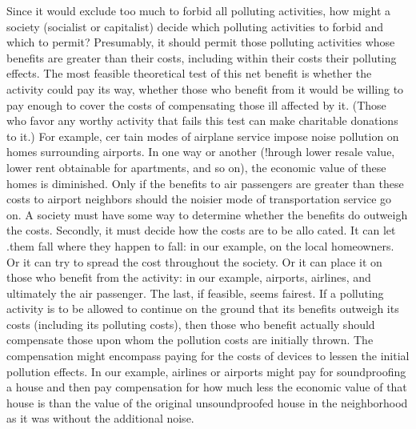 \documentclass[11pt,openany]{book}
\begin{document}
Since it would exclude too much to forbid all polluting activities, how might a society (socialist or capitalist) decide which polluting activities to forbid and which to permit? Presumably, it should permit those polluting activities whose benefits are greater than their costs, including within their costs their polluting effects. The most feasible theoretical test of this net benefit is whether the activity could pay its way, whether those who benefit from it would be willing to pay enough to cover the costs of compensating those ill affected by it. (Those who favor any worthy activity that fails this test can make charitable donations to it.) For example, cer tain modes of airplane service impose noise pollution on homes surrounding airports. In one way or another (!hrough lower resale value, lower rent obtainable for apartments, and so on), the economic value of these homes is diminished. Only if the benefits to air passengers are greater than these costs to airport neighbors should the noisier mode of transportation service go on. A society must have some way to determine whether the benefits do outweigh the costs. Secondly, it must decide how the costs are to be allo cated. It can let .them fall where they happen to fall: in our example, on the local homeowners. Or it can try to spread the cost throughout the society. Or it can place it on those who benefit from the activity: in our example, airports, airlines, and ultimately the air passenger. The last, if feasible, seems fairest. If a polluting activity is to be allowed to continue on the ground that its benefits outweigh its costs (including its polluting costs), then those who benefit actually should compensate those upon whom the pollution costs are initially thrown. The compensation might encompass paying for the costs of devices to lessen the initial pollution effects. In our example, airlines or airports might pay for soundproofing a house and then pay compensation for how much less the economic value of that house is than the value of the original unsoundproofed house in the neighborhood as it was without the additional noise. 
\end{document}
